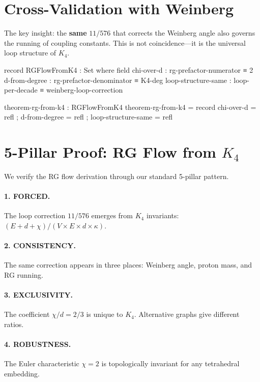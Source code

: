 \documentclass[11pt,a4paper]{book}
\begin{document}
\section{Cross-Validation with Weinberg}

The key insight: the \textbf{same} $11/576$ that corrects the Weinberg angle also governs the running of coupling constants. This is not coincidence---it is the universal loop structure of $K_4$.

\begin{code}
record RGFlowFromK4 : Set where
  field
    chi-over-d           : rg-prefactor-numerator ≡ 2
    d-from-degree        : rg-prefactor-denominator ≡ K4-deg
    loop-structure-same  : loop-per-decade ≡ weinberg-loop-correction

theorem-rg-from-k4 : RGFlowFromK4
theorem-rg-from-k4 = record
  { chi-over-d          = refl
  ; d-from-degree       = refl
  ; loop-structure-same = refl
  }
\end{code}

\section{5-Pillar Proof: RG Flow from \texorpdfstring{$K_4$}{K4}}

We verify the RG flow derivation through our standard 5-pillar pattern.

\paragraph{1. FORCED.} The loop correction $11/576$ emerges from $K_4$ invariants: $(E + d + \chi)/(V \times E \times d \times \kappa)$.

\paragraph{2. CONSISTENCY.} The same correction appears in three places: Weinberg angle, proton mass, and RG running.

\paragraph{3. EXCLUSIVITY.} The coefficient $\chi/d = 2/3$ is unique to $K_4$. Alternative graphs give different ratios.

\paragraph{4. ROBUSTNESS.} The Euler characteristic $\chi = 2$ is topologically invariant for any tetrahedral embedding.
\end{document}
